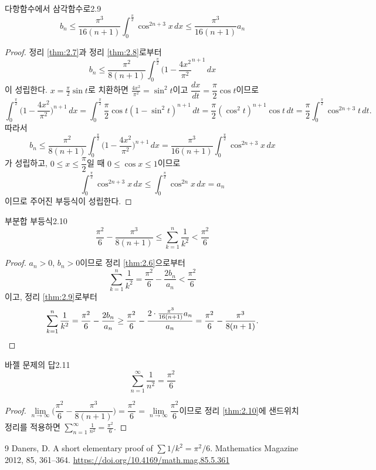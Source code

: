 \documentclass{article}
\begin{document}
\begin{thm}{다항함수에서 삼각함수로}{2.9}
	\[
		b_n\leq\frac{\pi^3}{16(n+1)}\int_0^{\tfrac{\pi}{2}}\cos^{2n+3}x\,dx\leq\frac{\pi^3}{16(n+1)}a_n
	\]
\end{thm}

\begin{proof}
	정리 \ref{thm:2.7}과 정리 \ref{thm:2.8}로부터
	\[
		b_n\leq\frac{\pi^2}{8(n+1)}\int_0^{\tfrac{\pi}{2}}\biggl(1-\frac{4x^2}{\pi^2}^{n+1}\,dx
	\]
	이 성립한다. $x=\frac{\pi}{2}\sin t$로 치환하면 $\frac{4x^2}{\pi^2}=\sin^2t$이고 $\dfrac{dx}{dt}=\dfrac{\pi}{2}\cos t$이므로
	\[
		\int_0^{\tfrac{\pi}{2}}\biggl(1-\frac{4x^2}{\pi^2}\biggr)^{n+1}\,dx=\int_0^{\tfrac{\pi}{2}}\frac{\pi}{2}\cos t(1-\sin^2t)^{n+1}\,dt=\frac{\pi}{2}(\cos^2t)^{n+1}\cos t\,dt=\frac{\pi}{2}\int_0^{\tfrac{\pi}{2}}\cos^{2n+3}t\,dt.
	\]
	따라서
	\[
		b_n\leq\frac{\pi^2}{8(n+1)}\int_0^{\tfrac{\pi}{2}}\biggl(1-\frac{4x^2}{\pi^2}\biggr)^{n+1}\,dx=\frac{\pi^3}{16(n+1)}\int_0^{\tfrac{\pi}{2}}\cos^{2n+3}x\,dx
	\]
	가 성립하고, $0\leq x\leq\dfrac{\pi}{2}$일 때 $0\leq\cos x\leq1$이므로
	\[
		\int_0^{\tfrac{\pi}{2}}\cos^{2n+3}x\,dx\leq\int_0^{\tfrac{\pi}{2}}\cos^{2n}x\,dx=a_n
	\]
	이므로 주어진 부등식이 성립한다.
\end{proof}

\begin{thm}{부분합 부등식}{2.10}
	\[
		\frac{\pi^2}{6}-\frac{\pi^3}{8(n+1)}\leq\sum_{k=1}^n\frac{1}{k^2}<\frac{\pi^2}{6}
	\]
\end{thm}

\begin{proof}
	$a_n>0$, $b_n>0$이므로 정리 \ref{thm:2.6}으로부터
	\[
		\sum_{k=1}^n\frac{1}{k^2}=\frac{\pi^2}{6}-\frac{2b_n}{a_n}<\frac{\pi^2}{6}
	\]
	이고, 정리 \ref{thm:2.9}로부터
	\[
		\sum_{k=1}^n\frac{1}{k^2}=\frac{\pi^2}{6}-\frac{2b_n}{a_n}\geq\frac{\pi^2}{6}-\frac{2\cdot\frac{\pi^3}{16(n+1)}a_n}{a_n}=\frac{\pi^2}{6}-\frac{\pi^3}{8(n+1)}.\qedhere
	\]
\end{proof}

\begin{thm}{바젤 문제의 답}{2.11}
	\[
		\sum_{n=1}^\infty\frac{1}{n^2}=\frac{\pi^2}{6}
	\]
\end{thm}

\begin{proof}
	$\lim\limits_{n\to\infty}\biggl(\dfrac{\pi^2}{6}-\dfrac{\pi^3}{8(n+1)}\biggr)=\dfrac{\pi^2}{6}=\lim\limits_{n\to\infty}\dfrac{\pi^2}{6}$이므로 정리 \ref{thm:2.10}에 샌드위치 정리를 적용하면 $\displaystyle\sum_{n=1}^\infty\frac{1}{n^2}=\frac{\pi^2}{6}$.
\end{proof}

\begin{thebibliography}{9}
	Daners, D. A short elementary proof of $\sum1/k^2=\pi^2/6$. Mathematics Magazine 2012, 85, 361–364. \url{https://doi.org/10.4169/math.mag.85.5.361}
\end{thebibliography}
\end{document}
